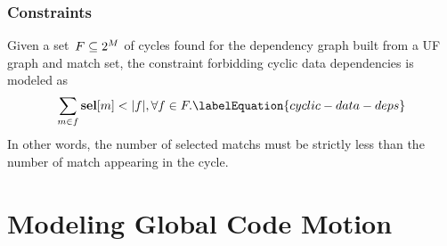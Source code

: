 \subsubsection{Constraints}

Given a set~\mbox{$\mForbiddenCombSet \subseteq \mPowerset{\mMatchSet}$} of
\glspl{cycle} found for the \gls{dependency graph} built from a \gls{UF graph}
and \gls{match set}, the \gls{constraint} forbidding cyclic data dependencies is
modeled as
%
\begin{equation}
  \sum_{m \in f} \mVar{sel}[m] < \mCard{f},
  \forall f \in \mForbiddenCombSet.
  \labelEquation{cyclic-data-deps}
\end{equation}
%
In other words, the number of selected \glspl{match} must be strictly less than
the number of \gls{match} appearing in the \gls{cycle}.


\section{Modeling Global Code Motion}

